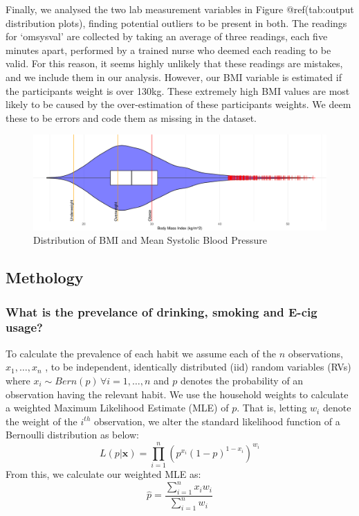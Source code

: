 \documentclass[
  11pt,
]{article}
\begin{document}
Finally, we analysed the two lab measurement variables in Figure
@ref(tab:output distribution plots), finding potential outliers to be
present in both. The readings for `omsysval' are collected by taking an
average of three readings, each five minutes apart, performed by a
trained nurse who deemed each reading to be valid. For this reason, it
seems highly unlikely that these readings are mistakes, and we include
them in our analysis. However, our BMI variable is estimated if the
participants weight is over 130kg. These extremely high BMI values are
most likely to be caused by the over-estimation of these participants
weights. We deem these to be errors and code them as missing in the
dataset.

\begin{figure}[H]
\includegraphics{Coursework_files/figure-latex/output distribution plots-1} \caption{Distribution of BMI and Mean Systolic Blood Pressure}\label{fig:output distribution plots}
\end{figure}

\subsection{Methology}\label{methology}

\subsubsection{What is the prevelance of drinking, smoking and E-cig
usage?}\label{what-is-the-prevelance-of-drinking-smoking-and-e-cig-usage}

To calculate the prevalence of each habit we assume each of the \(n\)
observations, \(x_1,…,x_n\) , to be independent, identically distributed
(iid) random variables (RVs) where
\(x_i \sim Bern(p)\, \forall i=1,…,n\) and \(p\) denotes the probability
of an observation having the relevant habit. We use the household
weights to calculate a weighted Maximum Likelihood Estimate (MLE) of
\(p\). That is, letting \(w_i\) denote the weight of the \(i^{th}\)
observation, we alter the standard likelihood function of a Bernoulli
distribution as below:
\[L(p|\textbf{x}) = \prod_{i = 1}^{n} (p^{x_i}(1-p)^{1-x_i})^{w_i}\]
From this, we calculate our weighted MLE as:
\[\widehat{p} = \frac{\sum_{i=1}^{n} x_iw_i}{\sum_{i=1}^{n} w_i}\]
\end{document}
